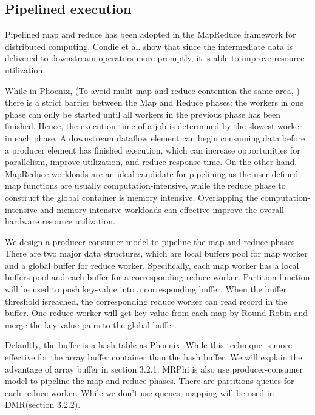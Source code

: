 \subsection{Pipelined execution}
Pipelined map and reduce has been adopted 
in the MapReduce framework for distributed computing\cite{Condie2010MapReduce,}. 
Condie et al. show that since the intermediate data is delivered to
downstream operators more promptly, 
it is able to improve resource utilization.

While in Phoenix, (To avoid mulit map and reduce contention the same area, )
there is a strict barrier between the Map and Reduce phases: 
the workers in one phase can only be started 
until all workers in the previous phase has been finished. 
Hence, the execution time of a job is determined by the
slowest worker in each phase. 
A downstream dataflow element can begin consuming data
before a producer element has finished execution, which can
increase opportunities for parallelism, improve utilization,
and reduce response time.
On the other hand, MapReduce workloads
are an ideal candidate for pipelining as the user-defined
map functions are usually computation-intensive, while the
reduce phase to construct the global container is memory
intensive\cite{talbot2011phoenix++}.
Overlapping the
computation-intensive and memory-intensive workloads 
can effective improve the overall hardware resource utilization.

We design a producer-consumer model to pipeline the
map and reduce phases.
There are two major data structures,
which are local buffers pool for map worker and 
a global buffer for reduce worker.
Specifically, 
each map worker has a local buffers pool and 
each buffer for a corresponding reduce worker.
Partition function will be used to push key-value into a corresponding
buffer.
When the buffer threshold isreached,
the corresponding reduce worker can read record in the buffer.
One reduce worker will get key-value from each map by Round-Robin and 
merge the key-value pairs to the global buffer.


Defaultly, the buffer is a hash table as Phoenix.
While this technique is more effective for the array buffer
container than the hash buffer. 
We will explain the advantage of array buffer in section 3.2.1.
MRPhi\cite{lu2013mrphi} is also use producer-consumer model to 
pipeline the map and reduce phases. 
There are partitions queues for each reduce worker.
While we don't use queues, mapping will be used in DMR(section 3.2.2).

